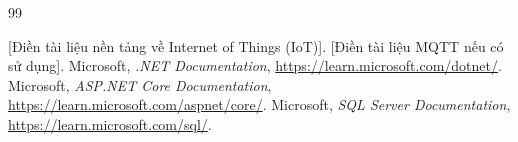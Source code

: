 \begin{thebibliography}{99}
[Điền tài liệu nền tảng về Internet of Things (IoT)].
[Điền tài liệu MQTT nếu có sử dụng].
Microsoft, \textit{.NET Documentation}, \url{https://learn.microsoft.com/dotnet/}.
Microsoft, \textit{ASP.NET Core Documentation}, \url{https://learn.microsoft.com/aspnet/core/}.
Microsoft, \textit{SQL Server Documentation}, \url{https://learn.microsoft.com/sql/}.
\end{thebibliography}
